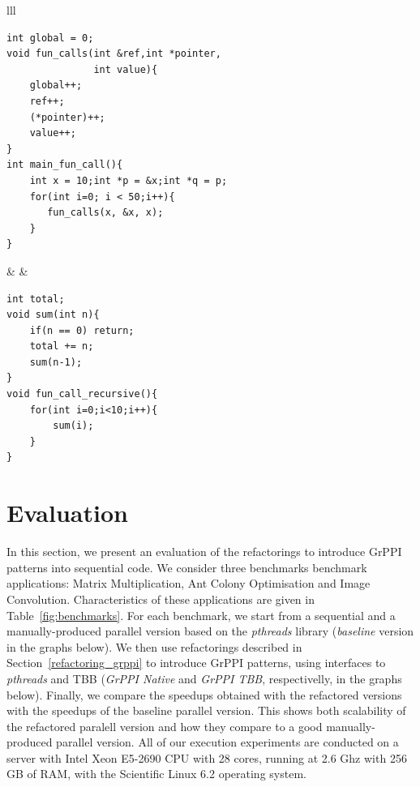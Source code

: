 \begin{tabular}{lll}
\noindent\begin{minipage}{.43\columnwidth}
\begin{lstlisting}[label=code:function_call,caption={Function Calls}]
int global = 0;
void fun_calls(int &ref,int *pointer, 
               int value){
    global++;
    ref++;
    (*pointer)++;
    value++;
}
int main_fun_call(){
    int x = 10;int *p = &x;int *q = p;
    for(int i=0; i < 50;i++){
       fun_calls(x, &x, x);
    }
}
\end{lstlisting}    
\end{minipage}
&
&
\noindent\begin{minipage}{.43\columnwidth}
\begin{lstlisting}[label=code:recursive_call,caption={Recursive Function Calls}]
int total;
void sum(int n){
    if(n == 0) return;
    total += n;
    sum(n-1);
}
void fun_call_recursive(){
    for(int i=0;i<10;i++){
        sum(i);
    }
}
\end{lstlisting}
\end{minipage}
\end{tabular}

\section{Evaluation}

\noindent
In this section, we present an evaluation of the refactorings to introduce GrPPI patterns into sequential code. We consider three benchmarks benchmark applications: Matrix Multiplication, Ant Colony Optimisation and Image Convolution. Characteristics of these applications are given in Table~\ref{fig:benchmarks}. For each benchmark, we start from a sequential and a manually-produced parallel version based on the \emph{pthreads} library (\emph{baseline} version in the graphs below). We then use refactorings described in Section~\ref{refactoring_grppi} to introduce GrPPI patterns, using interfaces to \emph{pthreads} and TBB (\emph{GrPPI Native} and \emph{GrPPI TBB}, respectivelly, in the graphs below). Finally, we compare the speedups obtained with the refactored versions with the speedups of the baseline parallel version. This shows both scalability of the refactored paralell version and how they compare to a good manually-produced parallel version. All of our execution experiments are conducted on a server with Intel Xeon E5-2690 CPU with 28 cores, running at 2.6 Ghz with 256 GB of RAM, with the Scientific Linux 6.2 operating system.

